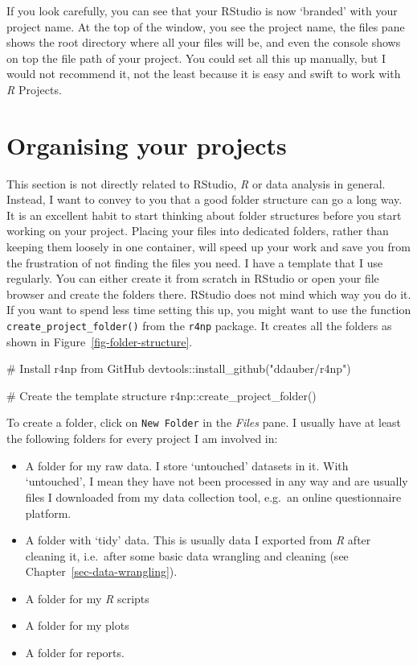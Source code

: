 \documentclass[
  letterpaper,
]{krantz}
\makeatletter
\newenvironment{Shaded}{\begin{snugshade}}{\end{snugshade}}
\newcommand{\CommentTok}[1]{\textcolor[rgb]{0.37,0.37,0.37}{#1}}
\newcommand{\FunctionTok}[1]{\textcolor[rgb]{0.28,0.35,0.67}{#1}}
\newcommand{\NormalTok}[1]{\textcolor[rgb]{0.00,0.23,0.31}{#1}}
\newcommand{\SpecialCharTok}[1]{\textcolor[rgb]{0.37,0.37,0.37}{#1}}
\newcommand{\StringTok}[1]{\textcolor[rgb]{0.13,0.47,0.30}{#1}}
\newenvironment{kframe}{%
\medskip{}
\setlength{\fboxsep}{.8em}
 \def\at@end@of@kframe{}%
 \ifinner\ifhmode%
  \def\at@end@of@kframe{\end{minipage}}%
  \begin{minipage}{\columnwidth}%
 \fi\fi%
 \def\FrameCommand##1{\hskip\@totalleftmargin \hskip-\fboxsep
 \colorbox{shadecolor}{##1}\hskip-\fboxsep
     \hskip-\linewidth \hskip-\@totalleftmargin \hskip\columnwidth}%
 \MakeFramed {\advance\hsize-\width
   \@totalleftmargin\z@ \linewidth\hsize
   \@setminipage}}%
 {\par\unskip\endMakeFramed%
 \at@end@of@kframe}
\renewenvironment{Shaded}{\begin{kframe}}{\end{kframe}}
\makeatother
\begin{document}
If you look carefully, you can see that your RStudio is now `branded'
with your project name. At the top of the window, you see the project
name, the files pane shows the root directory where all your files will
be, and even the console shows on top the file path of your project. You
could set all this up manually, but I would not recommend it, not the
least because it is easy and swift to work with \emph{R} Projects.

\section{Organising your projects}\label{sec-organising-your-projects}

This section is not directly related to RStudio, \emph{R} or data
analysis in general. Instead, I want to convey to you that a good folder
structure can go a long way. It is an excellent habit to start thinking
about folder structures before you start working on your project.
Placing your files into dedicated folders, rather than keeping them
loosely in one container, will speed up your work and save you from the
frustration of not finding the files you need. I have a template that I
use regularly. You can either create it from scratch in RStudio or open
your file browser and create the folders there. RStudio does not mind
which way you do it. If you want to spend less time setting this up, you
might want to use the function \texttt{create\_project\_folder()} from
the \texttt{r4np} package. It creates all the folders as shown in
Figure~\ref{fig-folder-structure}.

\begin{Shaded}
\begin{Highlighting}[]
\CommentTok{\# Install \textquotesingle{}r4np\textquotesingle{} from GitHub}
\NormalTok{devtools}\SpecialCharTok{::}\FunctionTok{install\_github}\NormalTok{(}\StringTok{"ddauber/r4np"}\NormalTok{)}

\CommentTok{\# Create the template structure}
\NormalTok{r4np}\SpecialCharTok{::}\FunctionTok{create\_project\_folder}\NormalTok{()}
\end{Highlighting}
\end{Shaded}

To create a folder, click on \texttt{New\ Folder} in the \emph{Files}
pane. I usually have at least the following folders for every project I
am involved in:

\begin{itemize}
\item
  A folder for my raw data. I store `untouched' datasets in it. With
  `untouched', I mean they have not been processed in any way and are
  usually files I downloaded from my data collection tool, e.g.~an
  online questionnaire platform.
\item
  A folder with `tidy' data. This is usually data I exported from
  \emph{R} after cleaning it, i.e.~after some basic data wrangling and
  cleaning (see Chapter~\ref{sec-data-wrangling}).
\item
  A folder for my \emph{R} scripts
\item
  A folder for my plots
\item
  A folder for reports.
\end{itemize}
\end{document}
